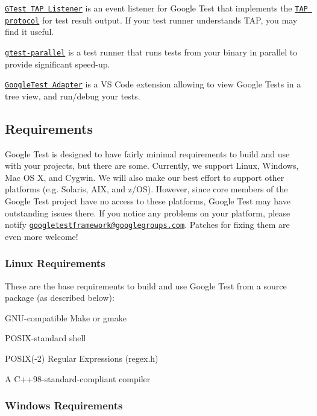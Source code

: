 \href{https://github.com/kinow/gtest-tap-listener}{\tt G\+Test T\+AP Listener} is an event listener for Google Test that implements the \href{https://en.wikipedia.org/wiki/Test_Anything_Protocol}{\tt T\+AP protocol} for test result output. If your test runner understands T\+AP, you may find it useful.

\href{https://github.com/google/gtest-parallel}{\tt gtest-\/parallel} is a test runner that runs tests from your binary in parallel to provide significant speed-\/up.

\href{https://marketplace.visualstudio.com/items?itemName=DavidSchuldenfrei.gtest-adapter}{\tt Google\+Test Adapter} is a VS Code extension allowing to view Google Tests in a tree view, and run/debug your tests.

\subsection*{Requirements}

Google Test is designed to have fairly minimal requirements to build and use with your projects, but there are some. Currently, we support Linux, Windows, Mac OS X, and Cygwin. We will also make our best effort to support other platforms (e.\+g. Solaris, A\+IX, and z/\+OS). However, since core members of the Google Test project have no access to these platforms, Google Test may have outstanding issues there. If you notice any problems on your platform, please notify \href{https://groups.google.com/forum/#!forum/googletestframework}{\tt googletestframework@googlegroups.\+com}. Patches for fixing them are even more welcome!

\subsubsection*{Linux Requirements}

These are the base requirements to build and use Google Test from a source package (as described below)\+:


\begin{DoxyItemize}
\item G\+N\+U-\/compatible Make or gmake
\item P\+O\+S\+I\+X-\/standard shell
\item P\+O\+S\+IX(-\/2) Regular Expressions (regex.\+h)
\item A C++98-\/standard-\/compliant compiler
\end{DoxyItemize}

\subsubsection*{Windows Requirements}


